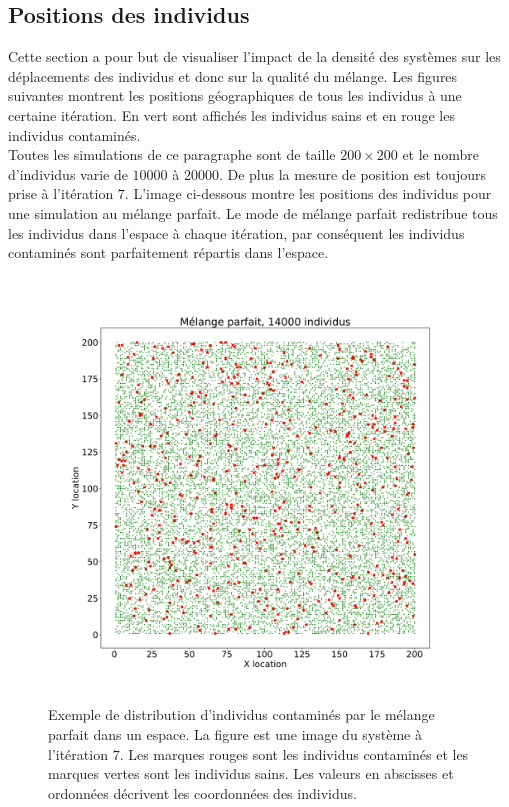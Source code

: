 \subsection{Positions des individus}

Cette section a pour but de visualiser l'impact de la densité des systèmes sur les déplacements des individus et donc sur la qualité du mélange. Les figures suivantes montrent les positions géographiques de tous les individus à une certaine itération. En vert sont affichés les individus sains et en rouge les individus contaminés.\\

Toutes les simulations de ce paragraphe sont de taille $200 \times 200$ et le nombre d'individus varie de $10000$ à $20000$. De plus la mesure de position est toujours prise à l'itération $7$. L'image ci-dessous montre les positions des individus pour une simulation au mélange parfait. Le mode de mélange parfait redistribue tous les individus dans l'espace à chaque itération, par conséquent les individus contaminés sont parfaitement répartis dans l'espace.

\begin{figure}[h]
	\centering
	\captionsetup{justification=centering}
	\includegraphics[width=.7\textwidth]{Images/SI_positions_14k_mix.pdf}
	\caption[Positions des individus : mélange parfait]{Exemple de distribution d'individus contaminés par le mélange parfait dans un espace. La figure est une image du système à l'itération $7$. Les marques rouges sont les individus contaminés et les marques vertes sont les individus sains. Les valeurs en abscisses et ordonnées décrivent les coordonnées des individus.}
\end{figure}

